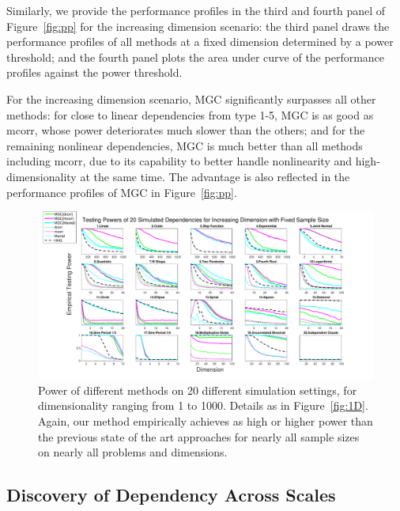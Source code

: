\documentclass[11pt]{article}
\begin{document}
Similarly, we provide the performance profiles in the third and fourth panel of Figure~\ref{fig:pp} for the increasing dimension scenario: the third panel draws the performance profiles of all methods at a fixed dimension determined by a power threshold; and the fourth panel plots the area under curve of the performance profiles against the power threshold.

For the increasing dimension scenario, MGC significantly surpasses all other methods: for close to linear dependencies from type 1-5, MGC is as good as mcorr, whose power deteriorates much slower than the others; and for the remaining nonlinear dependencies, MGC is much better than all methods including mcorr, due to its capability to better handle nonlinearity and high-dimensionality at the same time. The advantage is also reflected in the performance profiles of MGC in Figure~\ref{fig:pp}. %







\begin{figure}[htbp]
\includegraphics[width=1.0\textwidth]{../Figures/Fig5}
\caption{Power of different methods on 20 different simulation settings, for dimensionality ranging from 1 to 1000.  Details as in Figure~\ref{fig:1D}.
Again, our method empirically achieves as high or higher power than the previous state of the art approaches for nearly all sample sizes on nearly all problems and dimensions.
}
\label{fig:nD}
\end{figure}



\subsection{Discovery of Dependency Across Scales}
\end{document}
